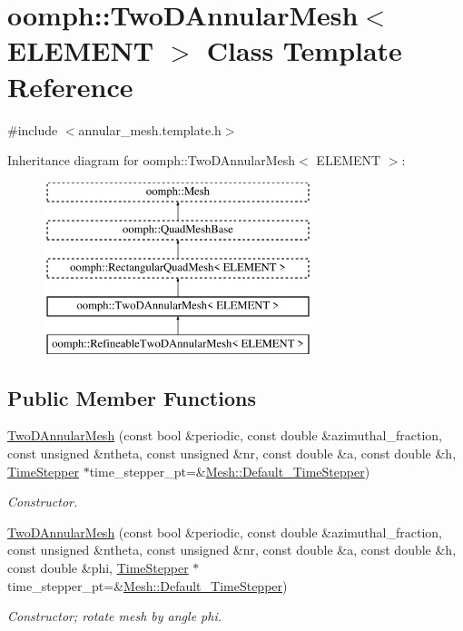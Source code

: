 \hypertarget{classoomph_1_1TwoDAnnularMesh}{}\section{oomph\+:\+:Two\+D\+Annular\+Mesh$<$ E\+L\+E\+M\+E\+NT $>$ Class Template Reference}
\label{classoomph_1_1TwoDAnnularMesh}


{\ttfamily \#include $<$annular\+\_\+mesh.\+template.\+h$>$}

Inheritance diagram for oomph\+:\+:Two\+D\+Annular\+Mesh$<$ E\+L\+E\+M\+E\+NT $>$\+:\begin{figure}[H]
\begin{center}
\leavevmode
\includegraphics[height=5.000000cm]{classoomph_1_1TwoDAnnularMesh}
\end{center}
\end{figure}
\subsection*{Public Member Functions}
\begin{DoxyCompactItemize}
\item 
\hyperlink{classoomph_1_1TwoDAnnularMesh_a4bb40bf0a81db8dc3493735007626c3b}{Two\+D\+Annular\+Mesh} (const bool \&periodic, const double \&azimuthal\+\_\+fraction, const unsigned \&ntheta, const unsigned \&nr, const double \&a, const double \&h, \hyperlink{classoomph_1_1TimeStepper}{Time\+Stepper} $\ast$time\+\_\+stepper\+\_\+pt=\&\hyperlink{classoomph_1_1Mesh_a12243d0fee2b1fcee729ee5a4777ea10}{Mesh\+::\+Default\+\_\+\+Time\+Stepper})
\begin{DoxyCompactList}\small\item\em Constructor. \end{DoxyCompactList}\item 
\hyperlink{classoomph_1_1TwoDAnnularMesh_a2d67eba43c6355893c7a95208068d387}{Two\+D\+Annular\+Mesh} (const bool \&periodic, const double \&azimuthal\+\_\+fraction, const unsigned \&ntheta, const unsigned \&nr, const double \&a, const double \&h, const double \&phi, \hyperlink{classoomph_1_1TimeStepper}{Time\+Stepper} $\ast$time\+\_\+stepper\+\_\+pt=\&\hyperlink{classoomph_1_1Mesh_a12243d0fee2b1fcee729ee5a4777ea10}{Mesh\+::\+Default\+\_\+\+Time\+Stepper})
\begin{DoxyCompactList}\small\item\em Constructor; rotate mesh by angle phi. \end{DoxyCompactList}\end{DoxyCompactItemize}
